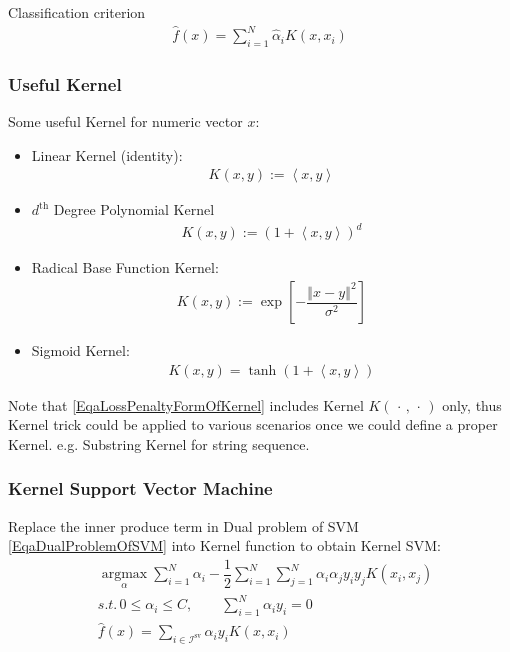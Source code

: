     Classification criterion
    \begin{align}
        \hat{f}(x) =\sum_{i=1}^N\hat{\alpha }_iK(x,x_i)
    \end{align}
    

\subsubsection{Useful Kernel}
    Some useful Kernel for numeric vector $ x $:
    \begin{itemize}[topsep=2pt,itemsep=0pt]
        \item Linear Kernel (identity):
        \begin{align}
            K(x,y):=\left\langle x,y \right\rangle 
        \end{align}        
        \item $ d^\mathrm{th}  $ Degree Polynomial Kernel
        \begin{align}
            K(x,y):=\left(1+\left\langle x,y \right\rangle \right)^d
        \end{align}
        \item Radical Base Function Kernel: 
        \begin{align}
            K(x,y):=\exp\left[ -\dfrac{\left\Vert x-y \right\Vert ^2}{\sigma ^2} \right] 
        \end{align}
        \item Sigmoid Kernel: 
        \begin{align}
            K(x,y)=\tanh\left(1+\left\langle x,y \right\rangle \right) 
        \end{align}
    \end{itemize}

    Note that \autoref{EqaLossPenaltyFormOfKernel} includes Kernel $ K(\,\cdot \,,\,\cdot \,) $ only, thus Kernel trick could be applied to various scenarios once we could define a proper Kernel. e.g. Substring Kernel for string sequence.


\subsubsection{Kernel Support Vector Machine}
    Replace the inner produce term in Dual problem of SVM \autoref{EqaDualProblemOfSVM} into Kernel function to obtain Kernel SVM:
    \begin{align}
         &\mathop{\arg\max}\limits_{\alpha  } \sum_{i=1}^N\alpha  _i-\dfrac{1}{2}\sum_{i=1}^N\sum_{j=1}^N\alpha  _i\alpha  _jy_iy_j K(x_i,x_j) \\
         &s.t.\, 0\leq \alpha _i\leq C,\qquad \sum_{i=1}^N\alpha _iy_i=0\\
         &\hat{f}(x)=\sum_{i\in\mathcal{I}^\mathrm{sv} }\alpha _iy_iK(x,x_i)
    \end{align}

